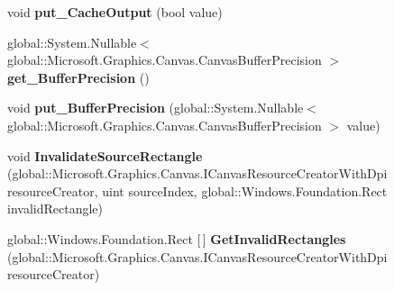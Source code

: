 \begin{DoxyCompactItemize}
\item 
\mbox{\label{class_microsoft_1_1_graphics_1_1_canvas_1_1_effects_1_1_linear_transfer_effect_af23aeeef5ee8f343acc69bddfe784e11}} 
void {\bfseries put\+\_\+\+Cache\+Output} (bool value)
\item 
\mbox{\label{class_microsoft_1_1_graphics_1_1_canvas_1_1_effects_1_1_linear_transfer_effect_a499637c57c6392016f9c537c3a0eacb4}} 
global\+::\+System.\+Nullable$<$ global\+::\+Microsoft.\+Graphics.\+Canvas.\+Canvas\+Buffer\+Precision $>$ {\bfseries get\+\_\+\+Buffer\+Precision} ()
\item 
\mbox{\label{class_microsoft_1_1_graphics_1_1_canvas_1_1_effects_1_1_linear_transfer_effect_ad927fc4a3ff8eb49961ca4d856b431f5}} 
void {\bfseries put\+\_\+\+Buffer\+Precision} (global\+::\+System.\+Nullable$<$ global\+::\+Microsoft.\+Graphics.\+Canvas.\+Canvas\+Buffer\+Precision $>$ value)
\item 
\mbox{\label{class_microsoft_1_1_graphics_1_1_canvas_1_1_effects_1_1_linear_transfer_effect_a128739a429a9c3d96da7d0bfa7439349}} 
void {\bfseries Invalidate\+Source\+Rectangle} (global\+::\+Microsoft.\+Graphics.\+Canvas.\+I\+Canvas\+Resource\+Creator\+With\+Dpi resource\+Creator, uint source\+Index, global\+::\+Windows.\+Foundation.\+Rect invalid\+Rectangle)
\item 
\mbox{\label{class_microsoft_1_1_graphics_1_1_canvas_1_1_effects_1_1_linear_transfer_effect_a650d689472ae784167eed6179451c9e4}} 
global\+::\+Windows.\+Foundation.\+Rect \mbox{[}$\,$\mbox{]} {\bfseries Get\+Invalid\+Rectangles} (global\+::\+Microsoft.\+Graphics.\+Canvas.\+I\+Canvas\+Resource\+Creator\+With\+Dpi resource\+Creator)
\item 
\mbox{\label{class_microsoft_1_1_graphics_1_1_canvas_1_1_effects_1_1_linear_transfer_effect_a28de051e59928e7c396a9ea5e44cb24d}} 

\end{DoxyCompactItemize}
